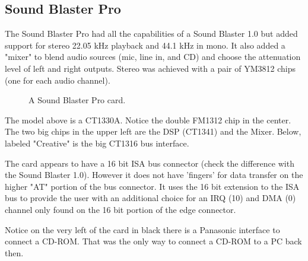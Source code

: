 \documentclass[book.tex]{subfiles}
\begin{document}
  \subsection{Sound Blaster Pro}
The Sound Blaster Pro had all the capabilities of a Sound Blaster 1.0 but added support for stereo 22.05 kHz playback and 44.1 kHz in mono. It also added a "mixer" to blend audio sources (mic, line in, and CD) and choose the attenuation level of left and right outputs. Stereo was achieved with a pair of YM3812 chips (one for each audio channel).\\\label{sbmixerpage}
\begin{figure}[H] 
  \centering 
  \caption{A Sound Blaster Pro card.}
\end{figure}
The model above is a CT1330A. Notice the double FM1312 chip in the center. The two big chips in the upper left are the DSP (CT1341) and the Mixer. Below, labeled "Creative" is the big CT1316 bus interface.\\
\par
{} The card appears to have a 16 bit ISA bus connector (check the difference with the Sound Blaster 1.0). However it does not have 'fingers' for data transfer on the higher "AT" portion of the bus connector. It uses the 16 bit extension to the ISA bus to provide the user with an additional choice for an IRQ (10) and DMA (0) channel only found on the 16 bit portion of the edge connector.\\
\par
{} Notice on the very left of the card in black there is a Panasonic interface to connect a CD-ROM. That was the only way to connect a CD-ROM to a PC back then.
\end{document}

